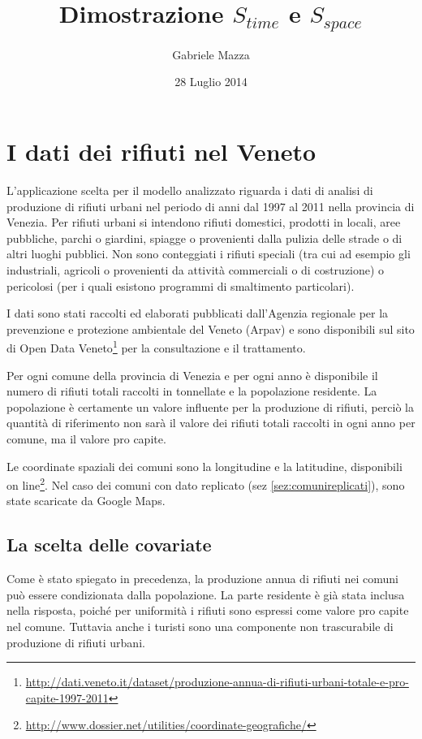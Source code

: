 \documentclass[a4paper,11pt,twoside,openright]{book}							%
\date{28 Luglio 2014}
\author{Gabriele Mazza}
\title{Dimostrazione $S_{time}$ e $S_{space}$}
\begin{document}

\chapter{I dati dei rifiuti nel Veneto}


L'applicazione scelta per il modello analizzato riguarda i dati di analisi di produzione di rifiuti urbani nel periodo di anni dal 1997 al 2011 nella provincia di Venezia. Per rifiuti urbani si intendono rifiuti domestici, prodotti in locali, aree pubbliche, parchi o giardini, spiagge o provenienti dalla pulizia delle strade o di altri luoghi pubblici. Non sono conteggiati i rifiuti speciali (tra cui ad esempio gli industriali, agricoli o provenienti da attività commerciali o di costruzione) o pericolosi (per i quali esistono programmi di smaltimento particolari).

I dati sono stati raccolti ed elaborati pubblicati dall'Agenzia regionale per la prevenzione e protezione ambientale del Veneto (Arpav) e sono disponibili sul sito di Open Data Veneto\footnote{\href{http://dati.veneto.it/dataset/produzione-annua-di-rifiuti-urbani-totale-e-pro-capite-1997-2011}{http://dati.veneto.it/dataset/produzione-annua-di-rifiuti-urbani-totale-e-pro-capite-1997-2011}} per la consultazione e il trattamento.

Per ogni comune della provincia di Venezia e per ogni anno è disponibile il numero di rifiuti totali raccolti in tonnellate e la popolazione residente. La popolazione è certamente un valore influente per la produzione di rifiuti, perciò la quantità di riferimento non sarà il valore dei rifiuti totali raccolti in ogni anno per comune, ma il valore pro capite.

Le coordinate spaziali dei comuni sono la longitudine e la latitudine, disponibili on line\footnote{\href{http://www.dossier.net/utilities/coordinate-geografiche/}{http://www.dossier.net/utilities/coordinate-geografiche/}}. Nel caso dei comuni con dato replicato (sez \ref{sez:comunireplicati}), sono state scaricate da Google Maps.


\section{La scelta delle covariate}

Come è stato spiegato in precedenza, la produzione annua di rifiuti nei comuni può essere condizionata dalla popolazione. La parte residente è già stata inclusa nella risposta, poiché per uniformità i rifiuti sono espressi come valore pro capite nel comune. Tuttavia anche i turisti sono una componente non trascurabile di produzione di rifiuti urbani.
\end{document}
